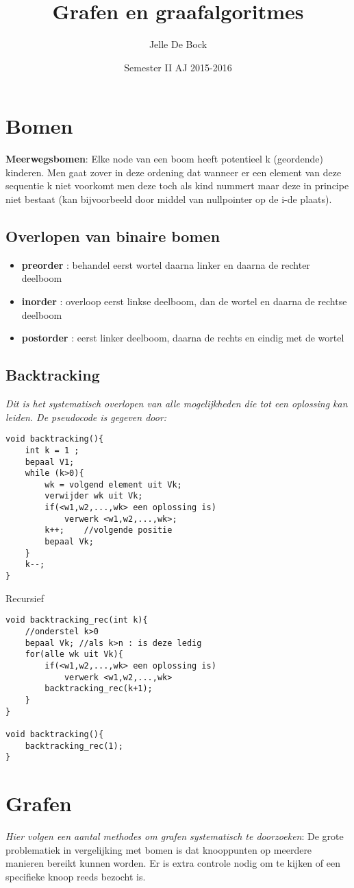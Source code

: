 \documentclass[11pt]{article}
\title{\textbf{Grafen en graafalgoritmes}}
\author{Jelle De Bock}
\date{Semester II  AJ 2015-2016}
\begin{document}
\maketitle

\section{Bomen}
\textbf{Meerwegsbomen}: Elke node van een boom heeft potentieel k (geordende) kinderen. Men gaat zover in deze ordening dat wanneer er een element van deze sequentie k niet voorkomt men deze toch als kind nummert maar deze in principe niet bestaat (kan bijvoorbeeld door middel van nullpointer op de i-de plaats). 
\subsection{Overlopen van binaire bomen}
\begin{itemize}
	\item \textbf{preorder} : behandel eerst wortel daarna linker en daarna de rechter deelboom
	\item \textbf{inorder} : overloop eerst linkse deelboom, dan de wortel en daarna de rechtse deelboom
	\item \textbf{postorder} : eerst linker deelboom, daarna de rechts en eindig met de wortel
\end{itemize}
\subsection{Backtracking}
\emph{Dit is het systematisch overlopen van alle mogelijkheden die tot een oplossing kan leiden. De pseudocode is gegeven door:}
\begin{lstlisting}
void backtracking(){
	int k = 1 ;
	bepaal V1;
	while (k>0){
		wk = volgend element uit Vk;
		verwijder wk uit Vk;
		if(<w1,w2,...,wk> een oplossing is)
			verwerk <w1,w2,...,wk>;
		k++; 	//volgende positie
		bepaal Vk;
	}
	k--;
}
\end{lstlisting}
Recursief
\begin{lstlisting}
void backtracking_rec(int k){
	//onderstel k>0
	bepaal Vk; //als k>n : is deze ledig
	for(alle wk uit Vk){
		if(<w1,w2,...,wk> een oplossing is)
			verwerk <w1,w2,...,wk>
		backtracking_rec(k+1);
	}
}

void backtracking(){
	backtracking_rec(1);
}
\end{lstlisting}

\section{Grafen}
\emph{Hier volgen een aantal methodes om grafen systematisch te doorzoeken}: De grote problematiek in vergelijking met bomen is dat knooppunten op meerdere manieren bereikt kunnen worden. Er is extra controle nodig om te kijken of een specifieke knoop reeds bezocht is.
\end{document}
